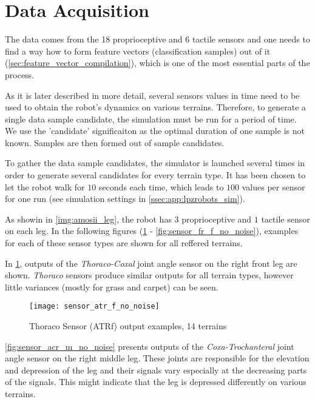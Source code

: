 \section{Data Acquisition} \label{sec:data_acquisition}
The data comes from the 18 proprioceptive and 6 tactile sensors and one needs to find a way how to form feature vectors (classification samples) out of it (\cref{sec:feature_vector_compilation}), which is one of the most essential parts of the process.

As it is later described in more detail, several sensors values in time need to be used to obtain the robot's dynamics on various terrains. Therefore, to generate a single data sample candidate, the simulation must be run for a period of time. We use the 'candidate' significaiton as the optimal duration of one sample is not known. Samples are then formed out of sample candidates.

To gather the data sample candidates, the simulator is launched several times in order to generate several candidates for every terrain type. It has been chosen to let the robot walk for $ 10 $ seconds each time, which leads to $ 100 $ values per sensor for one run (see simulation settings in \cref{ssec:app:lpzrobots_sim}).

As showin in \cref{img:amosii_leg}, the robot has $ 3 $ proprioceptive and $ 1 $ tactile sensor on each leg. In the following figures (\cref{fig:sensor_atr_f_no_noise} - \cref{fig:sensor_fr_f_no_noise}), examples for each of these sensor types are shown for all reffered terrains.

In \cref{fig:sensor_atr_f_no_noise}, outputs of the \textit{Thoraco-Coxal} joint angle sensor on the right front leg are shown. \textit{Thoraco} sensors produce similar outputs for all terrain types, however little variances (mostly for grass and carpet) can be seen.

\begin{figure}[H]
  \centering
  \texttt{[image: sensor\_atr\_f\_no\_noise]}
  \caption{Thoraco Sensor (ATRf) output examples, 14 terrains}
  \label{fig:sensor_atr_f_no_noise}
\end{figure}

\cref{fig:sensor_acr_m_no_noise} presents outputs of the \textit{Coxa-Trochanteral} joint angle sensor on the right middle leg. These joints are responsible for the elevation and depression of the leg and their signals vary especially at the decreasing parts of the signals. This might indicate that the leg is depressed differently on various terrains.

